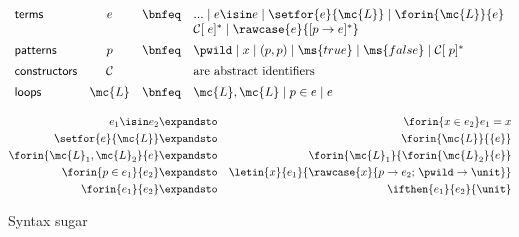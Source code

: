 \documentclass[preprint]{sigplanconf}
\renewcommand{\pipe}{\mathrel{\mid}} %
\begin{document}

\begin{figure}
  \[\begin{array}{lccl}
  \textsf{terms} &
  e &\bnfeq& ... \pipe e \isin e \pipe \setfor{e}{\mc{L}}
             \pipe \forin{\mc{L}}{e}\\
  &&& \mathcal{C}[\;e]^* \pipe \rawcase{e}{[{p} \to {e}]^*}
  \vspace{0.5em}\\
  \textsf{patterns} &
  p &\bnfeq& \pwild \pipe x \pipe (p,p)
             \pipe \ms{true} \pipe \ms{false} \pipe \mathcal{C}[\;p]^*
  \vspace{0.5em}\\
  \textsf{constructors} & \mathcal{C} && \text{are abstract identifiers}
  \vspace{0.5em}\\
  \textsf{loops} &
  \mc{L} &\bnfeq& \mc{L}, \mc{L} \pipe p \in e \pipe e
  \end{array}\]

  \begin{eqnarray*}
    e_1 \isin e_2            &\expandsto& \forin{x \in e_2} e_1 = x\\
    \setfor{e}{\mc{L}}       &\expandsto& \forin{\mc{L}}{\{e\}}\\
    \forin{\mc{L}_1,\mc{L}_2}{e}
    &\expandsto& \forin{\mc{L}_1}{\forin{\mc{L}_2}{e}}\\
    \forin{p\in e_1}{e_2}
    &\expandsto& \letin{x}{e_1}{\rawcase{x}{p \to e_2;\,\pwild \to \unit}}\\
    \forin{e_1}{e_2} &\expandsto& \ifthen{e_1}{e_2}{\unit}%
  \end{eqnarray*}
  \caption{Syntax sugar}
  \label{fig:sugar}
\end{figure}
\end{document}
